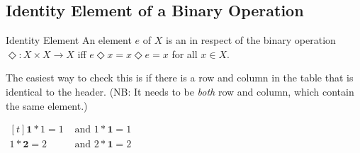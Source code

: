 \documentclass[\main/notes.tex]{subfiles}
\begin{document}
			\subsection{Identity Element of a Binary Operation}
				\begin{definition}{Identity Element}
					An element $e$ of $X$ is an  in respect of the binary operation $\Diamond: X \times X \rightarrow X$ iff $e \Diamond x = x \Diamond e = x$ for all $x \in X$.
				\end{definition}
				The easiest way to check this is if there is a row and column in the table that is identical to the header. (NB: It needs to be \emph{both} row and column, which contain the same element.)
				\begin{example}[hbox] $
					\begin{aligned}[t]
						\mathbf{1} * 1 = 1 &\text{ and } 1 * \mathbf{1} = 1\\
						1 * \mathbf{2} = 2 &\text{ and } 2 * \mathbf{1} = 2
					\end{aligned} $
				\end{example}
\end{document}
